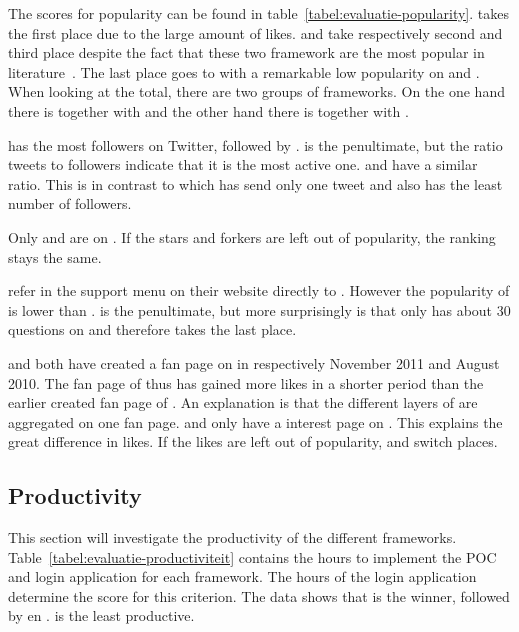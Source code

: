 \documentclass[a4paper]{artikel3}
\begin{document}
The scores for popularity can be found in table~\ref{tabel:evaluatie-popularity}. 
\kendoa{} takes the first place due to the large amount of \fb{} likes.
\jqma{} and \sta{} take respectively second and third place despite the fact that these two framework are the most popular in literature~\cite{David2011,Firtman2013,Hales2012,Oeflman2011}. 
The last place goes to \lungo{} with a remarkable low popularity on \so{} and \fb.
When looking at the total, there are two groups of frameworks.
On the one hand there is \kendoa{} together with \jqma{} and the other hand there is \sta{} together with \lungo{}.

\jqma{} has the most followers on Twitter, followed by \kendoa.
\lungo{} is the penultimate, but the ratio tweets to followers indicate that it is the most active one. 
\jqma{} and \kendoa{} have a similar ratio.
This is in contrast to \sta{} which has send only one tweet and also has the least number of followers. 

Only \jqma{} and \lungo{} are on \gh{}. 
If the \gh{} stars and \gh{} forkers are left out of popularity, the ranking stays the same.

\kendoa{} refer in the support menu on their website directly to \so{}. 
However the popularity of \kendoa{} is lower than \jqma{}.
\sta{} is the penultimate, but more surprisingly is that \lungo{} only has about 30 questions on \so{} and therefore takes the last place.

\kendoa{} and \jqma{} both have created a fan page on \fb{} in respectively November 2011 and August 2010.
The fan page of \kendoa{} thus has gained more \fb{} likes in a shorter period than the earlier created fan page of \jqma{}.
An explanation is that the different layers of \kendo{} are aggregated on one fan page.
\sta{} and \lungo{} only have a interest page on \fb.
This explains the great difference in \fb{} likes.
If the likes are left out of popularity, \kendoa{} and \jqma{} switch places.


\subsection{Productivity} %
\label{sec:evaluation-productivity}

This section will investigate the productivity of the different frameworks.
Table~\ref{tabel:evaluatie-productiviteit} contains the hours to implement the POC and login application for each framework.
The hours of the login application determine the score for this criterion.
The data shows that \jqma{} is the winner,  followed by \lungo{} en \kendoa{}.
\sta{} is the least productive.
\end{document}
